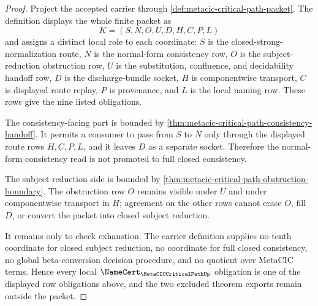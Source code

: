 \begin{proof}
Project the accepted carrier through \autoref{def:metacic-critical-path-packet}. The definition displays the whole finite packet as
$$
K=(S,N,O,U,D,H,C,P,L)
$$
and assigns a distinct local role to each coordinate: $S$ is the closed-strong-normalization route, $N$ is the normal-form consistency row, $O$ is the subject-reduction obstruction row, $U$ is the substitution, confluence, and decidability handoff row, $D$ is the discharge-bundle socket, $H$ is componentwise transport, $C$ is displayed route replay, $P$ is provenance, and $L$ is the local naming row. These rows give the nine listed obligations.

The consistency-facing part is bounded by \autoref{thm:metacic-critical-path-consistency-handoff}. It permits a consumer to pass from $S$ to $N$ only through the displayed route rows $H,C,P,L$, and it leaves $D$ as a separate socket. Therefore the normal-form consistency read is not promoted to full closed consistency.

The subject-reduction side is bounded by \autoref{thm:metacic-critical-path-obstruction-boundary}. The obstruction row $O$ remains visible under $U$ and under componentwise transport in $H$; agreement on the other rows cannot erase $O$, fill $D$, or convert the packet into closed subject reduction.

It remains only to check exhaustion. The carrier definition supplies no tenth coordinate for closed subject reduction, no coordinate for full closed consistency, no global beta-conversion decision procedure, and no quotient over MetaCIC terms. Hence every local $\NameCert_{\MetaCICCriticalPathUp}$ obligation is one of the displayed row obligations above, and the two excluded theorem exports remain outside the packet.
\end{proof}

